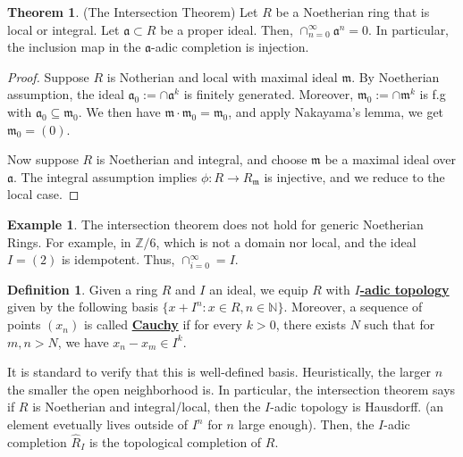 \documentclass{article}
\theoremstyle{definition}
\newtheorem{theorem}{Theorem}[section]
\theoremstyle{definition}
\theoremstyle{definition}
\theoremstyle{definition}
\theoremstyle{definition}
\newtheorem{definition}{Definition}[section]
\theoremstyle{definition}
\theoremstyle{definition}
\newtheorem{example}{Example}[section]
\begin{document}
\begin{tcolorbox}[colback=red!5!white,colframe=red!30!white]
\begin{theorem}
(The Intersection Theorem) Let $R$ be a Noetherian ring that is local or integral. Let $\mathfrak{a}\subset R$ be a proper ideal. Then, $\cap_{n=0}^{\infty} \mathfrak{a}^n=0$. In particular, the inclusion map in the $\mathfrak{a}$-adic completion is injection.
\end{theorem}
\end{tcolorbox}
\begin{proof}
 Suppose $R$ is Notherian and local with maximal ideal $\mathfrak{m}$. By Noetherian assumption, the ideal $\mathfrak{a}_0:=\cap \mathfrak{a}^k$ is finitely generated. Moreover, $\mathfrak{m}_0:=\cap \mathfrak{m}^k$ is f.g with $\mathfrak{a}_0\subseteq \mathfrak{m}_0$. We then have $\mathfrak{m}\cdot \mathfrak{m}_0=\mathfrak{m}_0$, and apply Nakayama's lemma, we get $\mathfrak{m}_0=(0)$. 
 
 Now suppose $R$ is Noetherian and integral, and choose $\mathfrak{m}$ be a maximal ideal over $\mathfrak{a}$. The integral assumption implies $\phi: R\to R_{\mathfrak{m}}$ is injective, and we reduce to the local case.
\end{proof}


\begin{tcolorbox}[colback=yellow!5!white,colframe=yellow!30!white]
\begin{example}
The intersection theorem does not hold for generic Noetherian Rings. For example, in $\mathbb{Z}/6$, which is not a domain nor local, and the ideal $I=(2)$ is idempotent. Thus, $\cap_{i=0}^{\infty}=I$. 
\end{example}
\end{tcolorbox}


\begin{tcolorbox}[colback=purple!5!white,colframe=purple!75!black]
\begin{definition}
Given a ring $R$ and $I$ an ideal, we equip $R$ with $I$\underline{\textbf{-adic topology}} given by the following basis $\{x+I^n: x\in R, n\in \mathbb{N}\}$. Moreover, a sequence of points $(x_n)$ is called \underline{\textbf{Cauchy}} if for every $k>0$, there exists $N$ such that for $m,n>N$, we have $x_n-x_m\in I^k$. 
\end{definition}
\end{tcolorbox}
It is standard to verify that this is well-defined basis. Heuristically, the larger $n$ the smaller the open neighborhood is. In particular, the intersection theorem says if $R$ is Noetherian and integral/local, then the $I$-adic topology is Hausdorff. (an element evetually lives outside of $I^n$ for $n$ large enough). Then, the $I$-adic completion $\widehat{R}_I$ is the topological completion of $R$. 
\end{document}
